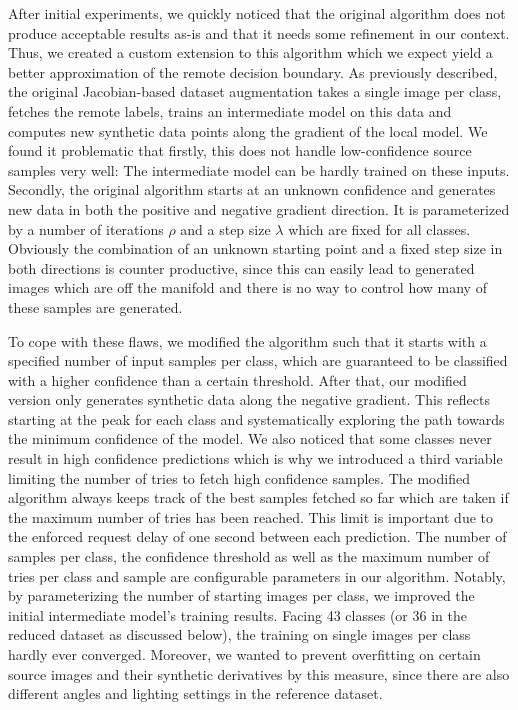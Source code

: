 After initial experiments, we quickly noticed that the original algorithm does not produce acceptable results as-is and that it needs some refinement in our context.
Thus, we created a custom extension to this algorithm which we expect yield a better approximation of the remote decision boundary.
As previously described, the original Jacobian-based dataset augmentation takes a single image per class, fetches the remote labels, trains an intermediate model on this data and computes new synthetic data points along the gradient of the local model.
We found it problematic that firstly, this does not handle low-confidence source samples very well: The intermediate model can be hardly trained on these inputs.
Secondly, the original algorithm starts at an unknown confidence and generates new data in both the positive and negative gradient direction.
It is parameterized by a number of iterations $\rho$ and a step size $\lambda$ which are fixed for all classes.
Obviously the combination of an unknown starting point and a fixed step size in both directions is counter productive, since this can easily lead to generated images which are off the manifold and there is no way to control how many of these samples are generated.

To cope with these flaws, we modified the algorithm such that it starts with a specified number of input samples per class, which are guaranteed to be classified with a higher confidence than a certain threshold.
After that, our modified version only generates synthetic data along the negative gradient.
This reflects starting at the peak for each class and systematically exploring the path towards the minimum confidence of the model.
We also noticed that some classes never result in high confidence predictions which is why we introduced a third variable limiting the number of tries to fetch high confidence samples.
The modified algorithm always keeps track of the best samples fetched so far which are taken if the maximum number of tries has been reached.
This limit is important due to the enforced request delay of one second between each prediction.
The number of samples per class, the confidence threshold as well as the maximum number of tries per class and sample are configurable parameters in our algorithm.
Notably, by parameterizing the number of starting images per class, we improved the initial intermediate model's training results. 
Facing 43 classes (or 36 in the reduced dataset as discussed below), the training on single images per class hardly ever converged.
Moreover, we wanted to prevent overfitting on certain source images and their synthetic derivatives by this measure, since there are also different angles and lighting settings in the reference dataset.

